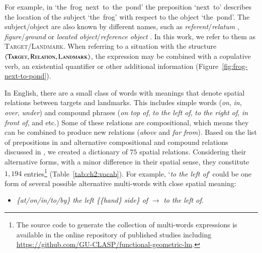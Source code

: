 For example, in `the~frog~next~to~the~pond' the preposition  `next~to' describes the location of the subject `the~frog' with respect to the object `the~pond'. The subject/object are also known by different names, such as \emph{referent}/\emph{relatum} \citep{Miller-JohnsonLaird:1976}, \emph{figure}/\emph{ground} \citep{Talmy:1983} or \emph{located object}/\emph{reference object} \citep{herskovits1986language,Gapp:1994:BasicMeanings,Dobnik:2009dz}.
In this work, we refer to them as  \textsc{Target}/\textsc{Landmark}. 
When referring to a situation with the structure  $\langle\textsc{Target},\textsc{Relation},\textsc{Landmark}\rangle$, 
the expression may be combined with a copulative verb, an existential quantifier or other additional information  (Figure~\ref{fig:frog-next-to-pond}).

In English, there are a small class of words with meanings that denote spatial relations between targets and landmarks. This includes simple words (\emph{on}, \emph{in}, \emph{over}, \emph{under}) and compound phrases (\emph{on top of}, \emph{to the left of}, \emph{to the right of}, \emph{in front of}, and etc.)
Some of these relations are compositional, which means they can be combined to produce new relations (\emph{above} and \emph{far from}). 
Based on the list of prepositions in \citep{landau1993whence}
and alternative compositional and compound relations discussed in  \cite[p.~156]{herskovits1986language}, we created a dictionary of $75$ spatial relations. Considering their alternative forms, with a minor difference in their spatial sense, they constitute $1,194$ entries\footnote{The source code to generate the collection of multi-words expressions is available in the online repository of published studies including \url{https://github.com/GU-CLASP/functional-geometric-lm}.} (Table~\ref{tab:ch2:vocab}). 
For example, `\emph{to the left of}' could be one form of several possible alternative multi-words with close spatial meaning:
\begin{itemize}[topsep=0em,itemsep=0em,partopsep=0em,parsep=0em]
	\item \emph{\{at/on/in/to/by\} the left \{\{hand\} side\} of} $\to$ \emph{to the left of}. 
\end{itemize}

